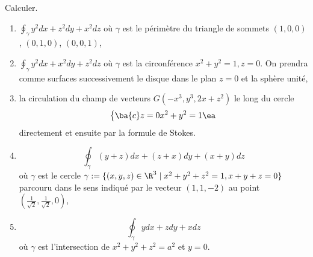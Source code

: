 
\begin{exercice}\label{exoVariete0017}

Calculer.
\begin{enumerate}
	\item 
		$\oint_\gamma y^2 dx + z^2 dy +x^2 dz$ où $\gamma$ est le périmètre du triangle de sommets $(1,0,0)$, $(0,1,0)$, $(0,0,1)$,

	\item
		$\oint_\gamma y^2 dx + x^2 dy +z^2 dz$ où $\gamma$ est la circonférence $x^2+y^2=1, z=0$. On prendra comme surfaces successivement le disque dans le  plan $z=0$ et la sphère unité,


	\item
		la circulation du champ de vecteurs $G(-x^3, y^3, 2x+z^2)$ le long du cercle $$\left\{\ba{c} z=0\\ x^2+y^2=1\ea \right. $$ directement et ensuite par la formule de Stokes. 
	\item 
		\[ \oint_{\gamma} (y+z)dx + (z+x)dy + (x+y) dz \]
		où $\gamma$ est le cercle $\gamma := \{ (x,y,z) \in \R^3 \mid x^2+ y^2 + z^2 =1, x+y+z=0 \}$ parcouru dans le sens indiqué par le vecteur $(1,1,- 2)$ au point $(\frac{1}{\sqrt{2}},\frac{1}{\sqrt{2}},0)$,

	\item
		\begin{equation}			
			\oint_\gamma ydx+zdy+xdz
		\end{equation}
		où $\gamma$ est l'intersection de $x^2+y^2+z^2=a^2$ et $y=0$.
\end{enumerate}

\end{exercice}
